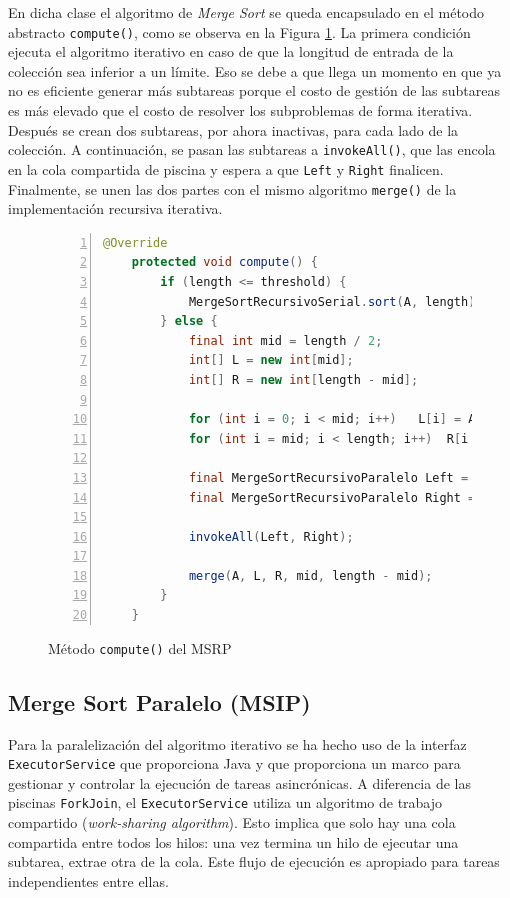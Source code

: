 \documentclass[titlepage]{article}
\begin{document}
En dicha clase el algoritmo de \textit{Merge Sort} se queda encapsulado en el método abstracto \lstinline{compute()}, como se observa en la Figura \ref{fig:MSRP_Compute}. La primera condición ejecuta el algoritmo iterativo en caso de que la longitud de entrada de la colección sea inferior a un límite. Eso se debe a que llega un momento en que ya no es eficiente generar más subtareas porque el costo de gestión de las subtareas es más elevado que el costo de resolver los subproblemas de forma iterativa. Después se crean dos subtareas, por ahora inactivas, para cada lado de la colección. A continuación, se pasan las subtareas a \lstinline{invokeAll()}, que las encola en la cola compartida de piscina y espera a que \lstinline{Left} y \lstinline{Right} finalicen. Finalmente, se unen las dos partes con el mismo algoritmo \lstinline{merge()} de la implementación recursiva iterativa.

\begin{figure}[hbtp]
    \begin{lstlisting}[language=java, frame=single, numbers=left]
    @Override
    protected void compute() {
        if (length <= threshold) {
            MergeSortRecursivoSerial.sort(A, length);
        } else {
            final int mid = length / 2;
            int[] L = new int[mid];
            int[] R = new int[length - mid];

            for (int i = 0; i < mid; i++)   L[i] = A[i];
            for (int i = mid; i < length; i++)  R[i - mid] = A[i];

            final MergeSortRecursivoParalelo Left = new  MergeSortRecursivoParalelo(L, mid);
            final MergeSortRecursivoParalelo Right = new  MergeSortRecursivoParalelo(R, length - mid);

            invokeAll(Left, Right);

            merge(A, L, R, mid, length - mid);
        }
    }
    \end{lstlisting}
    \caption{Método \lstinline{compute()} del MSRP}
    \label{fig:MSRP_Compute}
\end{figure}

\subsection{Merge Sort Paralelo (MSIP)}
Para la paralelización del algoritmo iterativo se ha hecho uso de la interfaz \lstinline{ExecutorService} que proporciona Java y que proporciona un marco para gestionar y controlar la ejecución de tareas asincrónicas. A diferencia de las piscinas \lstinline{ForkJoin}, el \lstinline{ExecutorService} utiliza un algoritmo de trabajo compartido (\textit{work-sharing algorithm}). Esto implica que solo hay una cola compartida entre todos los hilos: una vez termina un hilo de ejecutar una subtarea, extrae otra de la cola. Este flujo de ejecución es apropiado para tareas independientes entre ellas. 
\end{document}
